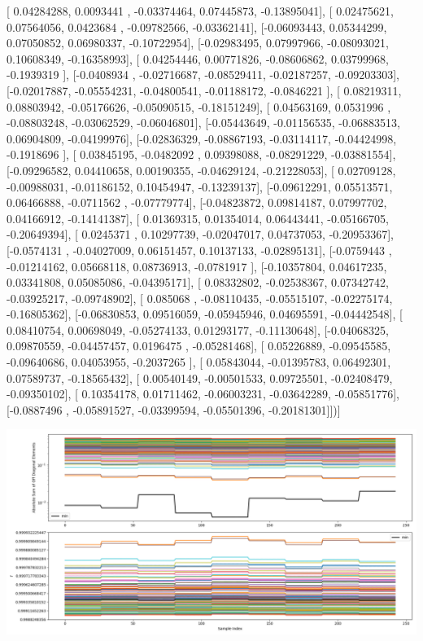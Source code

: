 \documentclass{article}
\begin{document}
       [ 0.04284288,  0.0093441 , -0.03374464,  0.07445873, -0.13895041],
       [ 0.02475621,  0.07564056,  0.0423684 , -0.09782566, -0.03362141],
       [-0.06093443,  0.05344299,  0.07050852,  0.06980337, -0.10722954],
       [-0.02983495,  0.07997966, -0.08093021,  0.10608349, -0.16358993],
       [ 0.04254446,  0.00771826, -0.08606862,  0.03799968, -0.1939319 ],
       [-0.0408934 , -0.02716687, -0.08529411, -0.02187257, -0.09203303],
       [-0.02017887, -0.05554231, -0.04800541, -0.01188172, -0.0846221 ],
       [ 0.08219311,  0.08803942, -0.05176626, -0.05090515, -0.18151249],
       [ 0.04563169,  0.0531996 , -0.08803248, -0.03062529, -0.06046801],
       [-0.05443649, -0.01156535, -0.06883513,  0.06904809, -0.04199976],
       [-0.02836329, -0.08867193, -0.03114117, -0.04424998, -0.1918696 ],
       [ 0.03845195, -0.0482092 ,  0.09398088, -0.08291229, -0.03881554],
       [-0.09296582,  0.04410658,  0.00190355, -0.04629124, -0.21228053],
       [ 0.02709128, -0.00988031, -0.01186152,  0.10454947, -0.13239137],
       [-0.09612291,  0.05513571,  0.06466888, -0.0711562 , -0.07779774],
       [-0.04823872,  0.09814187,  0.07997702,  0.04166912, -0.14141387],
       [ 0.01369315,  0.01354014,  0.06443441, -0.05166705, -0.20649394],
       [ 0.0245371 ,  0.10297739, -0.02047017,  0.04737053, -0.20953367],
       [-0.0574131 , -0.04027009,  0.06151457,  0.10137133, -0.02895131],
       [-0.0759443 , -0.01214162,  0.05668118,  0.08736913, -0.0781917 ],
       [-0.10357804,  0.04617235,  0.03341808,  0.05085086, -0.04395171],
       [ 0.08332802, -0.02538367,  0.07342742, -0.03925217, -0.09748902],
       [ 0.085068  , -0.08110435, -0.05515107, -0.02275174, -0.16805362],
       [-0.06830853,  0.09516059, -0.05945946,  0.04695591, -0.04442548],
       [ 0.08410754,  0.00698049, -0.05274133,  0.01293177, -0.11130648],
       [-0.04068325,  0.09870559, -0.04457457,  0.0196475 , -0.05281468],
       [ 0.05226889, -0.09545585, -0.09640686,  0.04053955, -0.2037265 ],
       [ 0.05843044, -0.01395783,  0.06492301,  0.07589737, -0.18565432],
       [ 0.00540149, -0.00501533,  0.09725501, -0.02408479, -0.09350102],
       [ 0.10354178,  0.01711462, -0.06003231, -0.03642289, -0.05851776],
       [-0.0887496 , -0.05891527, -0.03399594, -0.05501396, -0.20181301]])]
\begin{center}
\includegraphics[scale=.9]{report_pickled_controls248/control_dpn_all.png}

\end{center}
\end{document}
